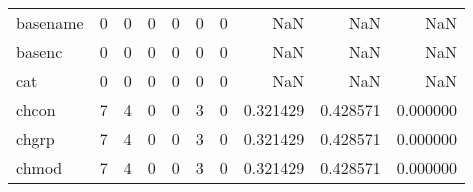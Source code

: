 \begin{tabular}{lrrrrrrrrr}
basename  &                                                  0 &                                                  0 &                                                  0 &                                                  0 &                                                  0 &                                                  0 &                                                NaN &                                    NaN &                                  NaN \\
basenc    &                                                  0 &                                                  0 &                                                  0 &                                                  0 &                                                  0 &                                                  0 &                                                NaN &                                    NaN &                                  NaN \\
cat       &                                                  0 &                                                  0 &                                                  0 &                                                  0 &                                                  0 &                                                  0 &                                                NaN &                                    NaN &                                  NaN \\
chcon     &                                                  7 &                                                  4 &                                                  0 &                                                  0 &                                                  3 &                                                  0 &                                           0.321429 &                               0.428571 &                             0.000000 \\
chgrp     &                                                  7 &                                                  4 &                                                  0 &                                                  0 &                                                  3 &                                                  0 &                                           0.321429 &                               0.428571 &                             0.000000 \\
chmod     &                                                  7 &                                                  4 &                                                  0 &                                                  0 &                                                  3 &                                                  0 &                                           0.321429 &                               0.428571 &                             0.000000 \\

\end{tabular}
